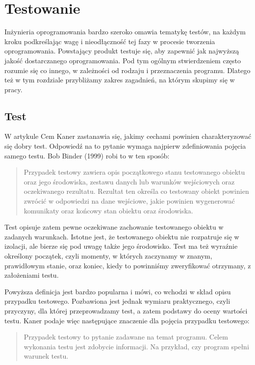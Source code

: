 \documentclass[00-praca-magisterska.tex]{subfiles}
\begin{document}
\chapter{Testowanie}
\label{testowanie}

Inżynieria oprogramowania bardzo szeroko omawia tematykę testów, na każdym
kroku podkreślając wagę i nieodłączność tej fazy w procesie tworzenia
oprogramowania.  Powstający produkt testuje się, aby zapewnić jak najwyższą
jakość dostarczanego oprogramowania. Pod tym ogólnym stwierdzeniem często
rozumie się co innego, w zależności od rodzaju i przeznaczenia programu.
Dlatego też w tym rozdziale przybliżamy zakres zagadnień, na którym skupimy się
w pracy.

\section{Test}
\label{test}

W artykule \cite{good-test} Cem Kaner zastanawia się, jakimy cechami powinien
charakteryzować się dobry test.  Odpowiedź na to pytanie wymaga najpierw
zdefiniowania pojęcia samego testu. Bob Binder (1999) robi to w ten sposób:

\begin{quote}
Przypadek testowy zawiera opis początkowego stanu testowanego obiektu oraz jego
środowiska, zestawu danych lub warunków wejściowych oraz oczekiwanego
rezultatu. Rezultat ten określa co testowany obiekt powinien zwrócić w
odpowiedzi na dane wejściowe, jakie powinien wygenerować komunikaty oraz
końcowy stan obiektu oraz środowiska.
\end{quote}

Test opisuje zatem pewne oczekiwane zachowanie testowanego obiektu w zadanych
warunkach. Istotne jest, że testowanego obiektu nie rozpatruje się w izolacji,
ale bierze się pod uwagę także jego środowisko. Test ma też wyraźnie określony
początek, czyli momenty, w których zaczynamy w znanym, prawidłowym stanie, oraz
koniec, kiedy to powinniśmy zweryfikować otrzymany, z założeniami testu.

Powyższa definicja jest bardzo popularna i mówi, co wchodzi w skład opisu
przypadku testowego. Pozbawiona jest jednak wymiaru praktycznego, czyli
przyczyny, dla której przeprowadzamy test, a zatem podstawy do oceny wartości
testu. Kaner \cite{good-test} podaje więc następujące znaczenie dla pojęcia
przypadku testowego:

\begin{quote}Przypadek testowy to pytanie zadawane na temat programu. Celem
wykonania testu jest zdobycie informacji. Na przykład, czy program spełni
warunek testu.
\end{quote}
\end{document}

